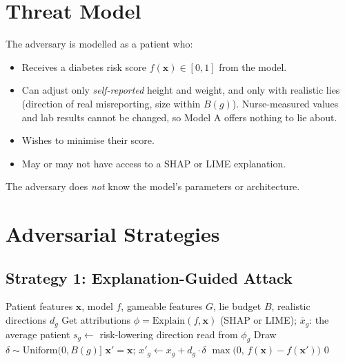 \documentclass[12pt, a4paper, oneside]{report}
\theoremstyle{definition}
\begin{document}
\section{Threat Model}

The adversary is modelled as a patient who:
\begin{itemize}
  \item Receives a diabetes risk score $f(\mathbf{x}) \in [0,1]$ from the model.
  \item Can adjust only \emph{self-reported} height and weight, and only
        with realistic lies (direction of real misreporting, size within
        $B(g)$). Nurse-measured values and lab results cannot be changed,
        so Model A offers nothing to lie about.
  \item Wishes to minimise their score.
  \item May or may not have access to a SHAP or LIME explanation.
\end{itemize}

The adversary does \textit{not} know the model's parameters or architecture.

\section{Adversarial Strategies}

\subsection{Strategy 1: Explanation-Guided Attack}

\begin{algorithm}
  \caption{Explanation-Guided Attack}
  \label{alg:explanation}
  \begin{algorithmic}[1]
    \Require Patient features $\mathbf{x}$, model $f$, gameable features $G$,
             lie budget $B$, realistic directions $d_g$
    \State Get attributions $\phi = \mathrm{Explain}(f, \mathbf{x})$
           (SHAP or LIME); $\bar{x}_g$: the average patient
      \State $s_g \leftarrow$ risk-lowering direction read from $\phi_g$
       
        \State Draw $\delta \sim \mathrm{Uniform}(0, B(g)]$
        \State $\mathbf{x}' = \mathbf{x}$; $x'_{g} \leftarrow x_{g} + d_g \cdot \delta$
        \State \Return $\max\bigl(0,\, f(\mathbf{x}) - f(\mathbf{x}')\bigr)$ 
      \EndIf
    \EndFor
    \State \Return $0$ 
  \end{algorithmic}
\end{algorithm}
\end{document}

